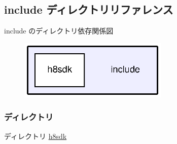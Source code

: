 \subsection{include ディレクトリリファレンス}
\label{dir_d44c64559bbebec7f509842c48db8b23}
include のディレクトリ依存関係図
\nopagebreak
\begin{figure}[H]
\begin{center}
\leavevmode
\includegraphics[width=202pt]{dir_d44c64559bbebec7f509842c48db8b23_dep}
\end{center}
\end{figure}
\subsubsection*{ディレクトリ}
\begin{DoxyCompactItemize}
\item 
ディレクトリ \hyperlink{dir_cccf68db23ba25fb97e4e5b2069f9a17}{h8sdk}
\end{DoxyCompactItemize}
